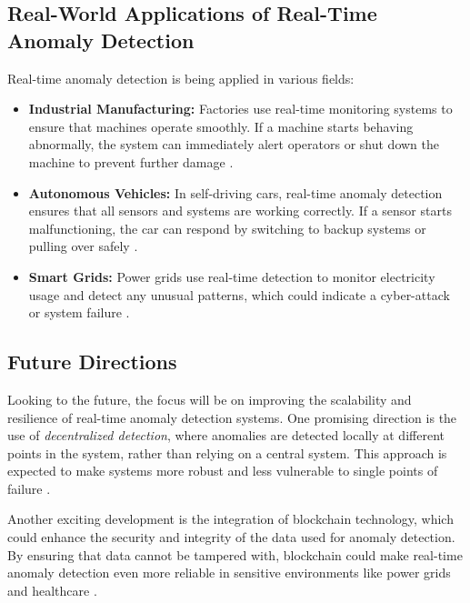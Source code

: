\subsection{Real-World Applications of Real-Time Anomaly Detection}

Real-time anomaly detection is being applied in various fields:

\begin{itemize}
    \item \textbf{Industrial Manufacturing:} Factories use real-time monitoring systems to ensure that machines operate smoothly. If a machine starts behaving abnormally, the system can immediately alert operators or shut down the machine to prevent further damage \cite{100}.
    \item \textbf{Autonomous Vehicles:} In self-driving cars, real-time anomaly detection ensures that all sensors and systems are working correctly. If a sensor starts malfunctioning, the car can respond by switching to backup systems or pulling over safely \cite{97,98}.
    \item \textbf{Smart Grids:} Power grids use real-time detection to monitor electricity usage and detect any unusual patterns, which could indicate a cyber-attack or system failure \cite{98}.
\end{itemize}

\subsection{Future Directions}

Looking to the future, the focus will be on improving the scalability and resilience of real-time anomaly detection systems. One promising direction is the use of \textit{decentralized detection}, where anomalies are detected locally at different points in the system, rather than relying on a central system. This approach is expected to make systems more robust and less vulnerable to single points of failure \cite{50}.

Another exciting development is the integration of blockchain technology, which could enhance the security and integrity of the data used for anomaly detection. By ensuring that data cannot be tampered with, blockchain could make real-time anomaly detection even more reliable in sensitive environments like power grids and healthcare \cite{101}.
